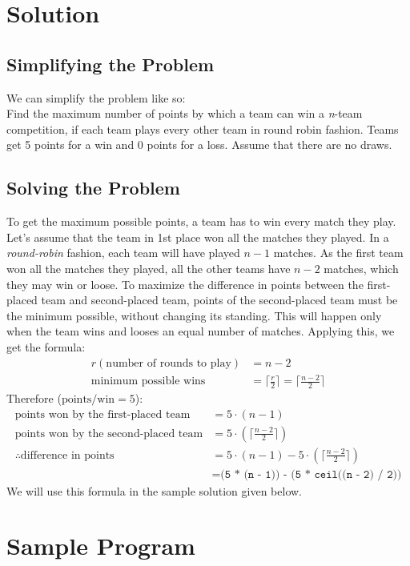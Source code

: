 \documentclass[12pt]{report}
\begin{document}
    \section*{Solution}
    \subsection*{Simplifying the Problem}
    We can simplify the problem like so:\\
    Find the maximum number of points by which a team can win a \textit{n}-team competition, if each team plays every other team in round robin fashion. Teams get 5 points for a win and 0 points for a loss. Assume that there are no draws.
    \subsection*{Solving the Problem}
    To get the maximum possible points, a team has to win every match they play. Let's assume that the team in 1st place won all the matches they played. In a \textit{round-robin} fashion, each team will have played $n-1$ matches. As the first team won all the matches they played, all the other teams have $n-2$ matches, which they may win or loose. To maximize the difference in points between the first-placed team and second-placed team, points of the second-placed team must be the minimum possible, without changing its standing. This will happen only when the team wins and looses an equal number of matches. Applying this, we get the formula:
    \begin{align*}
    r (\text{number of rounds to play}) &= n-2 \\
    \text{minimum possible wins} &= \lceil\frac{r}{2}\rceil = \lceil\frac{n-2}{2}\rceil
    \end{align*}
    Therefore ($\text{points/win}=5$):
    \begin{align*}
      \text{points won by the first-placed team} &= 5\cdot(n-1) \\
      \text{points won by the second-placed team} &= 5\cdot(\lceil\frac{n-2}{2}\rceil)\\
      \therefore\text{difference in points} &= 5\cdot(n-1) - 5\cdot(\lceil\frac{n-2}{2}\rceil)\\
      &= \texttt{(5 * (n - 1)) - (5 * ceil((n - 2) / 2))}
    \end{align*}
    We will use this formula in the sample solution given below.

	\section*{Sample Program}
	
	
\end{document}
